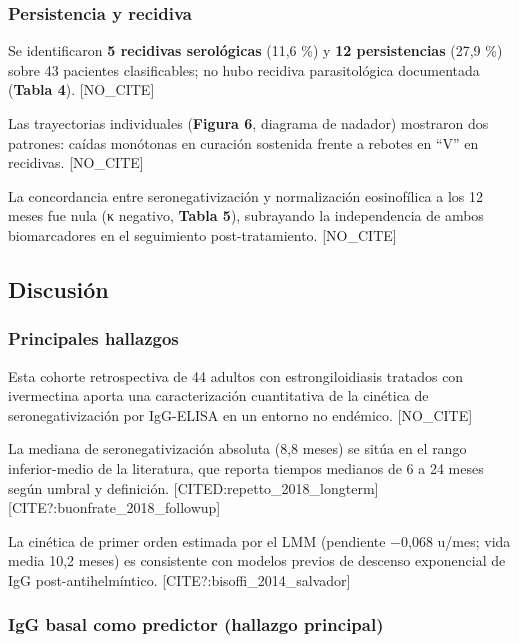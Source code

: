 \documentclass[
  spanish,
  12pt,
  a4paper,
]{article}
\begin{document}
\subsubsection{Persistencia y recidiva}\label{persistencia-y-recidiva}

Se identificaron \textbf{5 recidivas serológicas} (11,6 \%) y \textbf{12
persistencias} (27,9 \%) sobre 43 pacientes clasificables; no hubo
recidiva parasitológica documentada (\textbf{Tabla 4}). {[}NO\_CITE{]}

Las trayectorias individuales (\textbf{Figura 6}, diagrama de nadador)
mostraron dos patrones: caídas monótonas en curación sostenida frente a
rebotes en ``V'' en recidivas. {[}NO\_CITE{]}

La concordancia entre seronegativización y normalización eosinofílica a
los 12 meses fue nula (κ negativo, \textbf{Tabla 5}), subrayando la
independencia de ambos biomarcadores en el seguimiento post-tratamiento.
{[}NO\_CITE{]}

\subsection*{Discusión}\label{discusiuxf3n}

\subsubsection{Principales hallazgos}\label{principales-hallazgos}

Esta cohorte retrospectiva de 44 adultos con estrongiloidiasis tratados
con ivermectina aporta una caracterización cuantitativa de la cinética
de seronegativización por IgG-ELISA en un entorno no endémico.
{[}NO\_CITE{]}

La mediana de seronegativización absoluta (8,8 meses) se sitúa en el
rango inferior-medio de la literatura, que reporta tiempos medianos de 6
a 24 meses según umbral y definición.
{[}CITED:repetto\_2018\_longterm{]}
{[}CITE?:buonfrate\_2018\_followup{]}

La cinética de primer orden estimada por el LMM (pendiente −0,068 u/mes;
vida media 10,2 meses) es consistente con modelos previos de descenso
exponencial de IgG post-antihelmíntico.
{[}CITE?:bisoffi\_2014\_salvador{]}

\subsubsection{IgG basal como predictor (hallazgo
principal)}\label{igg-basal-como-predictor-hallazgo-principal}
\end{document}
